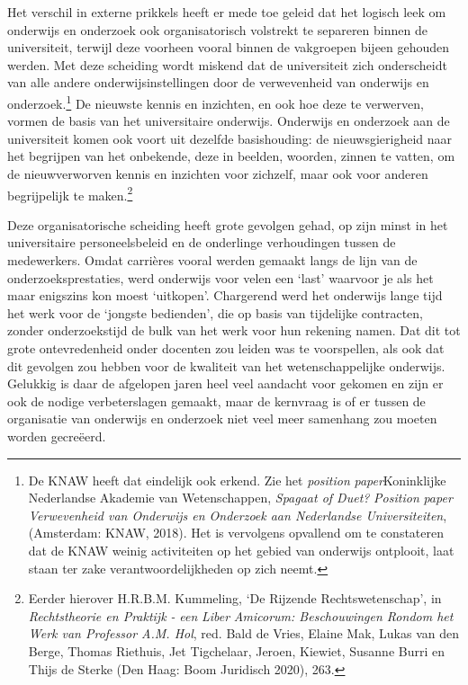 \documentclass[smallauthor, chapterhaspagenum, nochapterinheader, pagenuminheader,  bigchapnum,medium2, tocpages,  garamond, titleinheader]{jote-book}
\begin{document}
	Het verschil in externe prikkels heeft er mede toe geleid dat het logisch leek om onderwijs en onderzoek ook organisatorisch volstrekt te separeren binnen de universiteit, terwijl deze voorheen vooral binnen de vakgroepen bijeen gehouden werden. Met deze scheiding wordt miskend dat de universiteit zich onderscheidt van alle andere onderwijsinstellingen door de verwevenheid van onderwijs en onderzoek.\footnote{De KNAW heeft dat eindelijk ook erkend. Zie het \emph{position}\emph{ }\emph{paper}Koninklijke Nederlandse Akademie van Wetenschappen, \emph{Spagaat of Duet? }\emph{Position}\emph{ paper Verwevenheid van Onderwijs en Onderzoek aan Nederlandse Universiteiten}, (Amsterdam: KNAW, 2018). Het is vervolgens opvallend om te constateren dat de KNAW weinig activiteiten op het gebied van onderwijs ontplooit, laat staan ter zake verantwoordelijkheden op zich neemt.} De nieuwste kennis en inzichten, en ook hoe deze te verwerven, vormen de basis van het universitaire onderwijs. Onderwijs en onderzoek aan de universiteit komen ook voort uit dezelfde basishouding: de nieuwsgierigheid naar het begrijpen van het onbekende, deze in beelden, woorden, zinnen te vatten, om de nieuwverworven kennis en inzichten voor zichzelf, maar ook voor anderen begrijpelijk te maken.\footnote{Eerder hierover H.R.B.M. Kummeling, ‘De Rijzende Rechtswetenschap', in \emph{Rechtstheorie en Praktijk -}\emph{ }\emph{een}\emph{ }\emph{Liber }\emph{Amicorum}\emph{: Beschouwingen Rondom het Werk van Professor A.M. Hol}, red. Bald de Vries, Elaine Mak, Lukas van den Berge, Thomas Riethuis, Jet Tigchelaar, Jeroen, Kiewiet, Susanne Burri en Thijs de Sterke (Den Haag: Boom Juridisch 2020), 263.}



	Deze organisatorische scheiding heeft grote gevolgen gehad, op zijn minst in het universitaire personeelsbeleid en de onderlinge verhoudingen tussen de medewerkers. Omdat carrières vooral werden gemaakt langs de lijn van de onderzoeksprestaties, werd onderwijs voor velen een ‘last' waarvoor je als het maar enigszins kon moest ‘uitkopen'. Chargerend werd het onderwijs lange tijd het werk voor de ‘jongste bedienden', die op basis van tijdelijke contracten, zonder onderzoekstijd de bulk van het werk voor hun rekening namen. Dat dit tot grote ontevredenheid onder docenten zou leiden was te voorspellen, als ook dat dit gevolgen zou hebben voor de kwaliteit van het wetenschappelijke onderwijs. Gelukkig is daar de afgelopen jaren heel veel aandacht voor gekomen en zijn er ook de nodige verbeterslagen gemaakt, maar de kernvraag is of er tussen de organisatie van onderwijs en onderzoek niet veel meer samenhang zou moeten worden gecreëerd.
\end{document}

